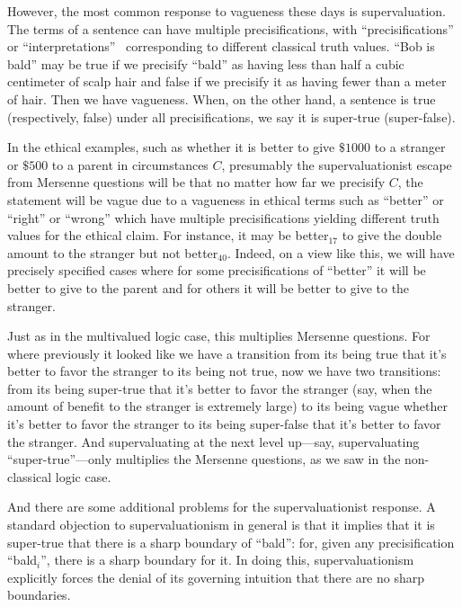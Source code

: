 However, the most common response to vagueness these days is supervaluation. The terms of a sentence can have multiple precisifications,
with ``precisifications'' or ``interpretations''~\parencite[p.~294n4]{WilliamsonVagueness} corresponding to different classical truth values. ``Bob is bald'' may be
true if we precisify ``bald'' as having less than half a cubic centimeter of scalp hair and false if we precisify it as
having fewer than a meter of hair. Then we have vagueness. When, on the other hand, a sentence is true (respectively, false) under all precisifications,
we say it is super-true (super-false).

In the ethical examples, such as whether it is better to give $ \$1000$ to a stranger or $ \$500$ to a parent in circumstances $C$, presumably the 
supervaluationist escape from Mersenne questions will be that no matter how far we precisify $C$, the statement will be vague due to a vagueness in 
ethical terms such as ``better'' or ``right'' or ``wrong'' which have multiple precisifications yielding different truth values for the ethical
claim. For instance, it may be better$_{17}$ to give the double amount to the stranger but not better$_{40}$. Indeed, on a view like this, we will have precisely specified cases where for some precisifications of ``better'' it will be better to 
give to the parent and for others it will be better to give to the stranger.

Just as in the multivalued logic case, this multiplies Mersenne questions. For where previously it looked like we have a transition from its being true that it's better
to favor the stranger to its being not true, now we have two transitions: from its being super-true that it's better to favor the stranger (say, when the amount of
benefit to the stranger is extremely large) to its being vague whether it's better to favor the stranger to its being super-false that it's better to favor the stranger.
And supervaluating at the next level up---say, supervaluating ``super-true''---only multiplies the Mersenne questions, 
as we saw in the non-classical logic case.

And there are some additional problems for the supervaluationist response. A standard objection to supervaluationism in general is that it implies that it is
super-true that there is a sharp boundary of ``bald'': for, given any precisification ``bald$_i$'', there is a sharp boundary for it. In doing this, supervaluationism
explicitly forces the denial of its governing intuition that there are no sharp boundaries. 

